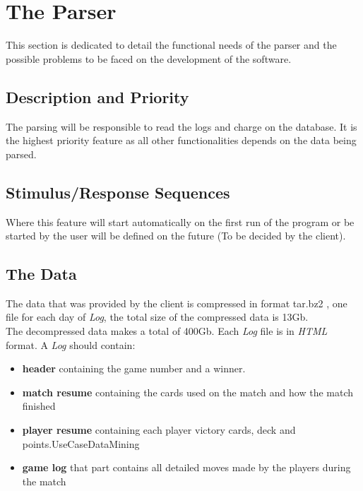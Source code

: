 \documentclass{scrreprt}
\begin{document}
\newpage




\section{The Parser}
This section is dedicated to detail the functional needs of the parser and the
possible problems to be faced on the development of the software.

\subsection{Description and Priority}
The parsing will be responsible to read the logs and charge on the database. It
is the highest priority feature as all other functionalities depends on the data
being parsed.

\subsection{Stimulus/Response Sequences}
Where this feature will start automatically on the first run of the program or
be started by the user will be defined on the future (To be decided by the client).

\subsection{The Data}
The data that was provided by the client is compressed in format tar.bz2 , one file for each day of \textit{Log}, the total size of the compressed data is
13Gb.\\
The decompressed data makes a total of 400Gb.
Each \textit{Log} file is in \textit{HTML} format.
A \textit{Log} should contain:
\begin{itemize}
  \item{\textbf{header}} containing the game number and a winner.
  \item{\textbf{match resume}} containing the cards used on the match and how the match
    finished
  \item{\textbf{player resume}} containing each player victory cards, deck and points.UseCaseDataMining
  \item{\textbf{game log}} that part contains all detailed moves made by the players
    during the match
\end{itemize}
\end{document}
